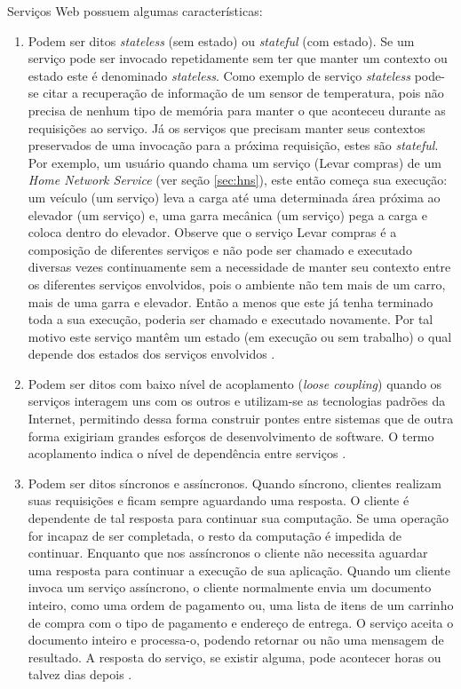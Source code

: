 Serviços Web possuem algumas características:
\begin{enumerate}
\item Podem ser ditos \textit{stateless} (sem estado) ou \textit{stateful} (com estado). Se um serviço pode ser invocado repetidamente sem ter que manter um contexto ou estado este é denominado \textit{stateless}. Como exemplo de serviço \textit{stateless} pode-se citar a recuperação de informação de um sensor de temperatura, pois não precisa de nenhum tipo de memória para manter o que aconteceu durante as requisições ao serviço. Já os serviços que precisam manter seus contextos preservados de uma invocação para a próxima requisição, estes são \textit{stateful}. Por exemplo, um usuário quando chama um serviço (Levar compras) de um \textit{Home Network Service} (ver seção \ref{sec:hns}), este então começa sua execução: um veículo (um serviço) leva a carga até uma determinada área próxima ao elevador (um serviço) e, uma garra mecânica (um serviço) pega a carga e coloca dentro do elevador. Observe que o serviço Levar compras é a composição de diferentes serviços e não pode ser chamado e executado diversas vezes continuamente sem a necessidade de manter seu contexto entre os diferentes serviços envolvidos, pois o ambiente não tem mais de um carro, mais de uma garra e elevador. Então a menos que este já tenha terminado toda a sua execução, poderia ser chamado e executado novamente. Por tal motivo este serviço mantêm um estado (em execução ou sem trabalho) o qual depende dos estados dos serviços envolvidos \cite{Papazoglou:2008}.
\item Podem ser ditos com baixo nível de acoplamento (\textit{loose coupling}) quando os serviços interagem uns com os outros e utilizam-se as tecnologias padrões da Internet, permitindo dessa forma construir pontes entre sistemas que de outra forma exigiriam grandes esforços de desenvolvimento de software. O termo acoplamento indica o nível de dependência entre serviços \cite{Papazoglou:2008}.
\item Podem ser ditos síncronos e assíncronos. Quando síncrono, clientes realizam suas requisições e ficam sempre aguardando uma resposta. O cliente é dependente de tal resposta para continuar sua computação. Se uma operação for incapaz de ser completada, o resto da computação é impedida de continuar. Enquanto que nos assíncronos o cliente não necessita aguardar uma resposta para continuar a execução de sua aplicação. Quando um cliente invoca um serviço assíncrono, o cliente normalmente envia um documento inteiro, como uma ordem de pagamento ou, uma lista de itens de um carrinho de compra com o tipo de pagamento e endereço de entrega. O serviço aceita o documento inteiro e processa-o, podendo retornar ou não uma mensagem de resultado. A resposta do serviço, se existir alguma, pode acontecer horas ou talvez dias depois \cite{Papazoglou:2008}.
\end{enumerate}

